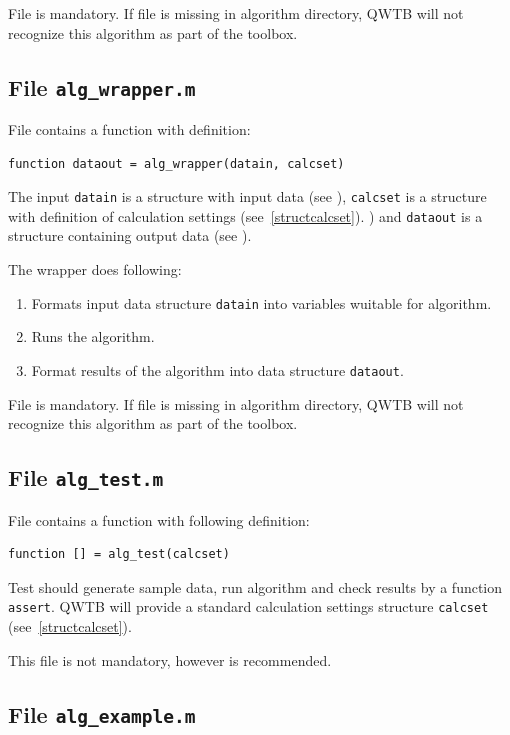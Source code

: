 \documentclass[12pt]{article} %
\begin{document}
File is mandatory. If file is missing in algorithm directory, QWTB will not recognize this
algorithm as part of the toolbox.

\subsection{File {\tt alg\_wrapper.m}} %
\label{filealgwrapper}
File contains a function with definition:

\begin{lstlisting}
function dataout = alg_wrapper(datain, calcset)
\end{lstlisting}

The input \lstinline{datain} is a structure with input data (see %
), \lstinline{calcset} is a structure with definition of calculation settings
(see~\ref{structcalcset}).
) and \lstinline{dataout} is a structure containing output data (see %
).

The wrapper does following:
\begin{enumerate}
        \item Formats input data structure \lstinline{datain} into variables wuitable for algorithm.
        \item Runs the algorithm.
        \item Format results of the algorithm into data structure \lstinline{dataout}.
\end{enumerate}

File is mandatory. If file is missing in algorithm directory, QWTB will not recognize this
algorithm as part of the toolbox.

\subsection{File {\tt alg\_test.m}} %
\label{filealgtest}
File contains a function with following definition:

\begin{lstlisting}
function [] = alg_test(calcset)
\end{lstlisting}

Test should generate sample data, run algorithm and check results by a function \lstinline{assert}.
QWTB will provide a standard calculation settings structure \lstinline{calcset} (see~\ref{structcalcset}).

This file is not mandatory, however is recommended.

\subsection{File {\tt alg\_example.m}} %
\label{filealgexample}
\end{document}
